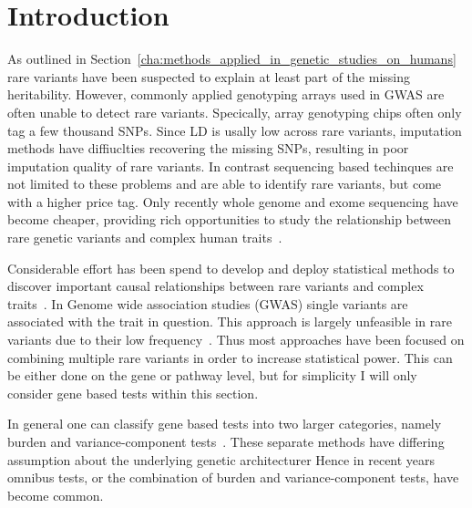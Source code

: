 \section{Introduction}
\label{sec:introduction}

As outlined in Section~\ref{cha:methods_applied_in_genetic_studies_on_humans} rare variants have been suspected to explain at least part of the missing heritability.
However, commonly applied genotyping arrays used in GWAS are often unable to detect rare variants.
Specically, array genotyping chips often only tag a few thousand SNPs.
Since LD is usally low across rare variants, imputation methods have diffiuclties recovering the missing SNPs, resulting in poor imputation quality of rare variants.
In contrast sequencing based techinques are not limited to these problems and are able to identify rare variants, but come with a higher price tag.
Only recently whole genome and exome sequencing have become cheaper, providing rich opportunities to study the relationship between rare genetic variants and complex human traits~\cite{Goodwin2016}.

Considerable effort has been spend to develop and deploy statistical methods to discover important causal relationships between rare variants and complex traits~\cite{Morris2010,Zeng2014,Daye2012,Manuscript2013}.
In Genome wide association studies (GWAS) single variants are associated with the trait in question.
This approach is largely unfeasible in rare variants due to their low frequency~\cite{Lee2014}.
Thus most approaches have been focused on combining multiple rare variants in order to increase statistical power.
This can be either done on the gene or pathway level, but for simplicity I will only consider gene based tests within this section.

In general one can classify gene based tests into two larger categories, namely burden and variance-component tests~\cite{Lee2014}.
These separate methods have differing assumption about the underlying genetic architecturer
Hence in recent years omnibus tests, or the combination of burden and variance-component tests, have become common.

